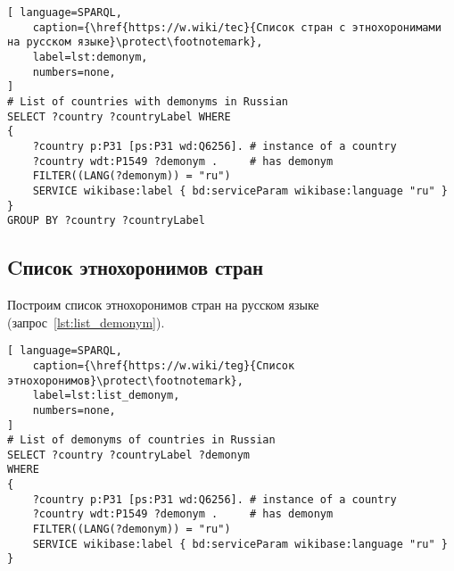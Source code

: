 \begin{lstlisting}[ language=SPARQL, 
    caption={\href{https://w.wiki/tec}{Список стран с этнохоронимами на русском языке}\protect\footnotemark},
    label=lst:demonym, 
    numbers=none,
]
# List of countries with demonyms in Russian
SELECT ?country ?countryLabel WHERE
{
	?country p:P31 [ps:P31 wd:Q6256]. # instance of a country
	?country wdt:P1549 ?demonym .     # has demonym
	FILTER((LANG(?demonym)) = "ru")
	SERVICE wikibase:label { bd:serviceParam wikibase:language "ru" }
}
GROUP BY ?country ?countryLabel
\end{lstlisting}





\subsection{Cписок этнохоронимов стран}


Построим список этнохоронимов стран на русском языке (запрос~\ref{lst:list_demonym}).

\begin{lstlisting}[ language=SPARQL, 
    caption={\href{https://w.wiki/teg}{Cписок этнохоронимов}\protect\footnotemark},
    label=lst:list_demonym, 
    numbers=none,
]
# List of demonyms of countries in Russian
SELECT ?country ?countryLabel ?demonym
WHERE
{
	?country p:P31 [ps:P31 wd:Q6256]. # instance of a country
	?country wdt:P1549 ?demonym .     # has demonym
	FILTER((LANG(?demonym)) = "ru")
	SERVICE wikibase:label { bd:serviceParam wikibase:language "ru" }
}
\end{lstlisting}





